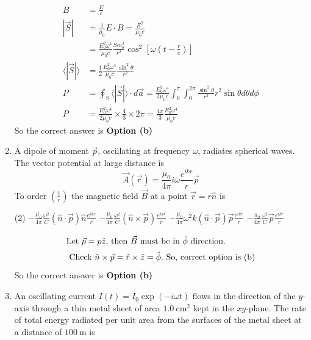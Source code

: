 \begin{enumerate}
\begin{answer}
	\begin{align*}
	B&=\frac{E}{c}\\
	|\vec{S}|&=\frac{1}{\mu_{0}} E \cdot B=\frac{E^{2}}{\mu_{0} c}\\&=\frac{E_{0}^{2} \omega^{4}}{\mu_{0} c} \frac{S m_{\theta}^{2}}{r^{2}} \cos ^{2}\left[\omega\left(t-\frac{r}{c}\right)\right]\\
	\langle|\vec{S}|\rangle&=\frac{1}{2} \frac{E_{0}^{2} \omega^{4}}{\mu_{0} c} \frac{\sin ^{2} \theta}{r^{2}}\\
	P&=\oint_{S}\langle|\vec{S}|\rangle \cdot d \vec{a}=\frac{E_{0}^{2} \omega^{4}}{2 \mu_{0} c} \int_{0}^{\pi} \int_{0}^{2 \pi} \frac{\sin ^{2} \theta}{r^{2}} r^{2} \sin \theta d \theta d \phi\\
	P&=\frac{E_{0}^{2} \omega^{4}}{2 \mu_{0} c} \times \frac{4}{3} \times 2 \pi=\frac{4 \pi}{3} \frac{E_{0}^{2} \omega^{4}}{\mu_{0} c}
	\end{align*}
	So the correct answer is \textbf{Option (b)}
\end{answer}
	\item  A dipole of moment $\vec{p}$, oscillating at frequency $\omega$, radiates spherical waves. The vector potential at large distance is
	$$
	\vec{A}(\vec{r})=\frac{\mu_{0}}{4 \pi} i \omega \frac{e^{i k r}}{r} \vec{p}
	$$
	To order $\left(\frac{1}{r}\right)$ the magnetic field $\vec{B}$ at a point $\vec{r}=r \hat{n}$ is
	{}
	\begin{tasks}(2)
		\task[\textbf{a.}]$-\frac{\mu_{0}}{4 \pi} \frac{\omega^{2}}{C}(\hat{n} \cdot \vec{p}) \hat{n} \frac{e^{i k r}}{r}$
		\task[\textbf{b.}] $-\frac{\mu_{0}}{4 \pi} \frac{\omega^{2}}{C}(\hat{n} \times \vec{p}) \frac{e^{i k r}}{r}$
		\task[\textbf{c.}] $-\frac{\mu_{0}}{4 \pi} \omega^{2} k(\hat{n} \cdot \vec{p}) \vec{p} \frac{e^{i k r}}{r}$
		\task[\textbf{d.}] $-\frac{\pi_{0}}{4 \pi} \frac{\omega^{2}}{C} \vec{p} \frac{e^{i k r}}{r}$
	\end{tasks}
\begin{answer}
	\begin{align*}
	\intertext{Let $\vec{p}=p \hat{z}$, then $\vec{B}$ must be in $\hat{\phi}$ direction.}
	\intertext{ Check $\hat{n} \times \vec{p}=\hat{r} \times \hat{z}=\hat{\phi} .$ So, correct option is (b)}
	\end{align*}
	So the correct answer is \textbf{Option (b)}
\end{answer}
	\item  An oscillating current $I(t)=I_{0} \exp (-i \omega t)$ flows in the direction of the $y$-axis through a thin metal sheet of area $1.0 \mathrm{~cm}^{2}$ kept in the $x y$-plane. The rate of total energy radiated per unit area from the surfaces of the metal sheet at a distance of $100 \mathrm{~m}$ is

\end{enumerate}
